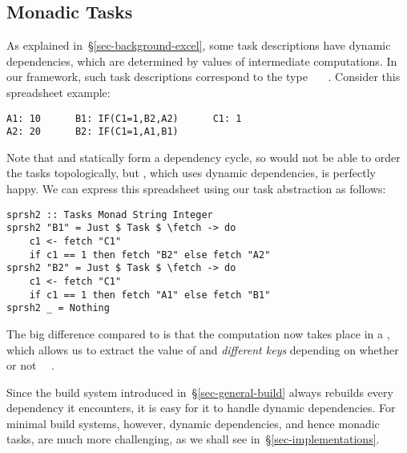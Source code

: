 \subsection{Monadic Tasks}\label{sec-task-monad}

As explained in~\S\ref{sec-background-excel}, some task descriptions have
dynamic dependencies, which are determined by values of intermediate
computations. In our framework, such task descriptions correspond to the type
~~~. Consider this spreadsheet example:

\vspace{0.5mm}
\begin{verbatim}
A1: 10      B1: IF(C1=1,B2,A2)      C1: 1
A2: 20      B2: IF(C1=1,A1,B1)
\end{verbatim}
\vspace{0.5mm}

\noindent
Note that  and  statically form a dependency cycle, so \Make
would not be able to order the tasks topologically, but \Excel, which uses
dynamic dependencies, is perfectly happy. We can express this spreadsheet using
our task abstraction as follows:


\vspace{1mm}
\begin{verbatim}
sprsh2 :: Tasks Monad String Integer
sprsh2 "B1" = Just $ Task $ \fetch -> do
    c1 <- fetch "C1"
    if c1 == 1 then fetch "B2" else fetch "A2"
sprsh2 "B2" = Just $ Task $ \fetch -> do
    c1 <- fetch "C1"
    if c1 == 1 then fetch "A1" else fetch "B1"
sprsh2 _ = Nothing
\end{verbatim}
\vspace{1mm}

\noindent
The big difference compared to  is that the computation now takes
place in a , which allows us to extract the value of  and
 \emph{different keys} depending on whether or not ~\hs{==}~.

Since the  build system introduced in~\S\ref{sec-general-build} always
rebuilds every dependency it encounters, it is easy for it to handle dynamic
dependencies. For minimal build systems, however, dynamic dependencies, and hence
monadic tasks, are much more challenging, as we shall see
in~\S\ref{sec-implementations}.

